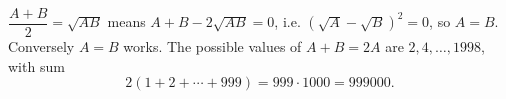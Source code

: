$\dfrac{A+B}{2}=\sqrt{AB}$ means $A+B-2\sqrt{AB}=0$, i.e. $\left(\sqrt A-\sqrt B\right)^2=0$, so $A=B$. Conversely $A=B$ works. The possible values of $A+B=2A$ are $2,4,\dots,1998$, with sum
\[
2(1+2+\cdots+999)=999\cdot1000=\boxed{999000}.
\]
